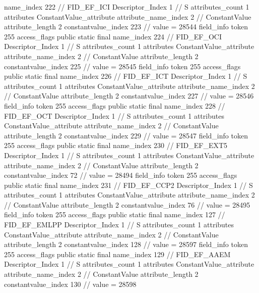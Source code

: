 {{{{{				name_index	222		// FID_EF_ICI
				Descriptor_Index	1		// S
				attributes_count	1
				attributes {
				ConstantValue_attribute {
					attribute_name_index	2		// ConstantValue
					attribute_length	2
					constantvalue_index	223		// value = 28544
				}
				}
			}
			field_info {
				token	255
				access_flags	public static final
				name_index	224		// FID_EF_OCI
				Descriptor_Index	1		// S
				attributes_count	1
				attributes {
				ConstantValue_attribute {
					attribute_name_index	2		// ConstantValue
					attribute_length	2
					constantvalue_index	225		// value = 28545
				}
				}
			}
			field_info {
				token	255
				access_flags	public static final
				name_index	226		// FID_EF_ICT
				Descriptor_Index	1		// S
				attributes_count	1
				attributes {
				ConstantValue_attribute {
					attribute_name_index	2		// ConstantValue
					attribute_length	2
					constantvalue_index	227		// value = 28546
				}
				}
			}
			field_info {
				token	255
				access_flags	public static final
				name_index	228		// FID_EF_OCT
				Descriptor_Index	1		// S
				attributes_count	1
				attributes {
				ConstantValue_attribute {
					attribute_name_index	2		// ConstantValue
					attribute_length	2
					constantvalue_index	229		// value = 28547
				}
				}
			}
			field_info {
				token	255
				access_flags	public static final
				name_index	230		// FID_EF_EXT5
				Descriptor_Index	1		// S
				attributes_count	1
				attributes {
				ConstantValue_attribute {
					attribute_name_index	2		// ConstantValue
					attribute_length	2
					constantvalue_index	72		// value = 28494
				}
				}
			}
			field_info {
				token	255
				access_flags	public static final
				name_index	231		// FID_EF_CCP2
				Descriptor_Index	1		// S
				attributes_count	1
				attributes {
				ConstantValue_attribute {
					attribute_name_index	2		// ConstantValue
					attribute_length	2
					constantvalue_index	76		// value = 28495
				}
				}
			}
			field_info {
				token	255
				access_flags	public static final
				name_index	127		// FID_EF_EMLPP
				Descriptor_Index	1		// S
				attributes_count	1
				attributes {
				ConstantValue_attribute {
					attribute_name_index	2		// ConstantValue
					attribute_length	2
					constantvalue_index	128		// value = 28597
				}
				}
			}
			field_info {
				token	255
				access_flags	public static final
				name_index	129		// FID_EF_AAEM
				Descriptor_Index	1		// S
				attributes_count	1
				attributes {
				ConstantValue_attribute {
					attribute_name_index	2		// ConstantValue
					attribute_length	2
					constantvalue_index	130		// value = 28598
				}
				}
}}}}}
